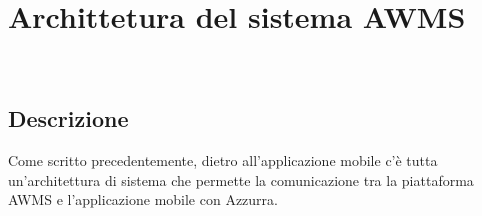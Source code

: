 \chapter{Archittetura del sistema AWMS}
\label{cap:archittettura del sistema AWMS}

\\


\section{Descrizione}
Come scritto precedentemente, dietro all'applicazione mobile c'è tutta un'architettura di sistema che permette la comunicazione tra la piattaforma \gls{AWMS}\ap{[g]} e l'applicazione mobile con Azzurra.
 
